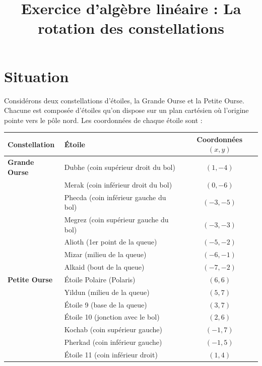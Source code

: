 \documentclass[11pt,letterpaper]{article}
\title{Exercice d'algèbre linéaire : La rotation des constellations}
\author{}
\date{}
\begin{document}
\maketitle

\section{Situation}

Considérons deux constellations d'étoiles, la Grande Ourse et la Petite Ourse.
Chacune est composée d'étoiles qu'on dispose sur un plan cartésien où l'origine
pointe vers le pôle nord. Les coordonnées de chaque étoile sont :

\begin{center}
  \begin{tabular}{llc}
    \toprule
    \textbf{Constellation} & \textbf{Étoile}                       & \textbf{Coordonnées $(x, y)$} \\
    \midrule
    \textbf{Grande Ourse}  & Dubhe (coin supérieur droit du bol)   &           $(1, -4)$           \\
                           & Merak (coin inférieur droit du bol)   &           $(0, -6)$           \\
                           & Phecda (coin inférieur gauche du bol) &          $(-3, -5)$           \\
                           & Megrez (coin supérieur gauche du bol) &          $(-3, -3)$           \\
                           & Alioth (1er point de la queue)        &          $(-5, -2)$           \\
                           & Mizar (milieu de la queue)            &          $(-6, -1)$           \\
                           & Alkaid (bout de la queue)             &          $(-7, -2)$           \\
    \addlinespace
    \textbf{Petite Ourse}  & Étoile Polaire (Polaris)              &           $(6, 6)$            \\
                           & Yildun (milieu de la queue)           &           $(5, 7)$            \\
                           & Étoile 9 (base de la queue)           &           $(3, 7)$            \\
                           & Étoile 10 (jonction avec le bol)      &           $(2, 6)$            \\
                           & Kochab (coin supérieur gauche)        &           $(-1, 7)$           \\
                           & Pherkad (coin inférieur gauche)       &           $(-1, 5)$           \\
                           & Étoile 11 (coin inférieur droit)      &           $(1, 4)$            \\
    \bottomrule
  \end{tabular}
\end{center}
\end{document}
